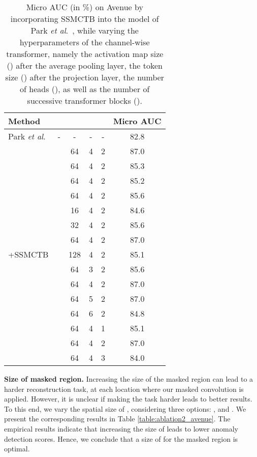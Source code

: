 \documentclass[10pt,journal,compsoc]{IEEEtran}
\newcommand{\etal}{\textit{et al}.}
\begin{document}
\begin{table}[t!]
\centering 
\caption{Micro AUC (in \%) on Avenue by incorporating SSMCTB into the model of Park \etal~\cite{Park-CVPR-2020}, while varying the hyperparameters of the channel-wise transformer, namely the activation map size () after the average pooling layer, the token size () after the projection layer, the number of heads (), as well as the number of successive transformer blocks ().}
\vspace{-0.2cm}
\setlength\tabcolsep{5.0pt}
\small
\begin{tabular}{| l | c | c | c | c | c |} 
\hline
{Method} &  &  & {} &  &  {Micro AUC} \\
\hline \hline
{Park \etal~\cite{Park-CVPR-2020}}
& - & - & - & - & 82.8 \\
\hline
\multirow{16}{*}{+SSMCTB} &  & 64 & 4 & 2 & {87.0} \\
&  & 64 & 4 & 2 & {85.3} \\
&  & 64 & 4 & 2 & {85.2} \\
&  & 64 & 4 & 2 & {85.6} \\
\cline{2-6}
&  & 16 & 4 & 2 & {84.6}  \\
&  & 32 & 4 & 2 & {85.6}  \\
&  & 64 & 4 & 2 & {87.0} \\
&  & 128 & 4 & 2 & {85.1} \\
\cline{2-6}
&  & 64 & 3 & 2 & {85.6}  \\
&  & 64 & 4 & 2 & {87.0} \\
&  & 64 & 5 & 2 & {87.0} \\
&  & 64 & 6 & 2 & {84.8} \\
\cline{2-6}
&  & 64 & 4 & 1 & 85.1  \\
&  & 64 & 4 & 2 & {87.0} \\
&  & 64 & 4 & 3 & 84.0 \\
\hline
\end{tabular}
\vspace{-0.2cm}
\label{table:ablation3_avenue} \end{table}

\noindent
\textbf{Size of masked region.}
Increasing the size of the masked region  can lead to a harder reconstruction task, at each location where our masked convolution is applied. However, it is unclear if making the task harder leads to better results. To this end, we vary the spatial size of , considering three options: ,  and . We present the corresponding results in Table \ref{table:ablation2_avenue}. The empirical results indicate that increasing the size of  leads to lower anomaly detection scores. Hence, we conclude that a size of  for the masked region  is optimal.
\end{document}
